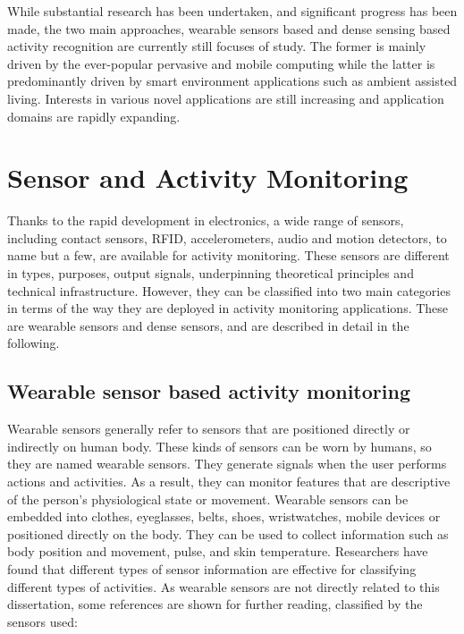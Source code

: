 While substantial research has been undertaken, and significant progress has been made, the two main approaches, wearable sensors based and dense sensing based activity recognition are currently still focuses of study. The former is mainly driven by the ever-popular pervasive and mobile computing while the latter is predominantly driven by smart environment applications such as ambient assisted living. Interests in various novel applications are still increasing and application domains are rapidly expanding.

\section{Sensor and Activity Monitoring}
\label{sec:soa:monitoring}

Thanks to the rapid development in electronics, a wide range of sensors, including contact sensors, RFID, accelerometers, audio and motion detectors, to name but a few, are available for activity monitoring. These sensors are different in types, purposes, output signals, underpinning theoretical principles and technical infrastructure. However, they can be classified into two main categories in terms of the way they are deployed in activity monitoring applications. These are wearable sensors and dense sensors, and are described in detail in the following.

\subsection{Wearable sensor based activity monitoring}

Wearable sensors generally refer to sensors that are positioned directly or indirectly on human body. These kinds of sensors can be worn by humans, so they are named wearable sensors. They generate signals when the user performs actions and activities. As a result, they can monitor features that are descriptive of the person’s physiological state or movement. Wearable sensors can be embedded into clothes, eyeglasses, belts, shoes, wristwatches, mobile devices or positioned directly on the body. They can be used to collect information such as body position and movement, pulse, and skin temperature. Researchers have found that different types of sensor information are effective for classifying different types of activities. As wearable sensors are not directly related to this dissertation, some references are shown for further reading, classified by the sensors used:

